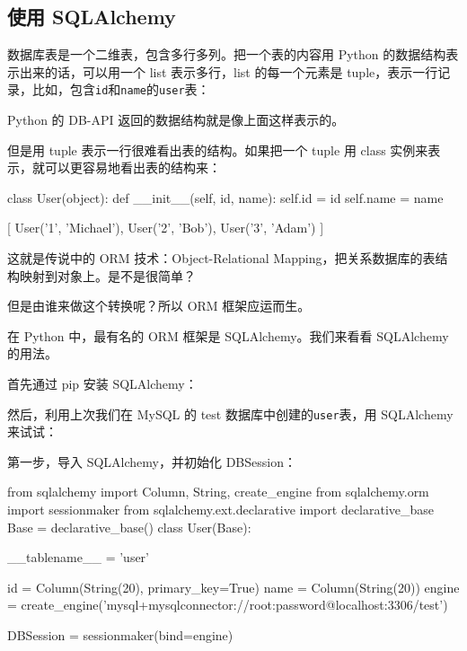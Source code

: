 \hypertarget{ux4f7fux7528-sqlalchemy}{%
\subsection{使用 SQLAlchemy}\label{ux4f7fux7528-sqlalchemy}}

数据库表是一个二维表，包含多行多列。把一个表的内容用 Python
的数据结构表示出来的话，可以用一个 list 表示多行，list 的每一个元素是
tuple，表示一行记录，比如，包含\texttt{id}和\texttt{name}的\texttt{user}表：

\begin{pythoncode}
\end{pythoncode}

Python 的 DB-API 返回的数据结构就是像上面这样表示的。

但是用 tuple 表示一行很难看出表的结构。如果把一个 tuple 用 class
实例来表示，就可以更容易地看出表的结构来：

\begin{pythoncode}
class User(object):
    def __init__(self, id, name):
        self.id = id
        self.name = name

[
    User('1', 'Michael'),
    User('2', 'Bob'),
    User('3', 'Adam')
]
\end{pythoncode}

这就是传说中的 ORM 技术：Object-Relational
Mapping，把关系数据库的表结构映射到对象上。是不是很简单？

但是由谁来做这个转换呢？所以 ORM 框架应运而生。

在 Python 中，最有名的 ORM 框架是 SQLAlchemy。我们来看看 SQLAlchemy
的用法。

首先通过 pip 安装 SQLAlchemy：


然后，利用上次我们在 MySQL 的 test 数据库中创建的\texttt{user}表，用
SQLAlchemy 来试试：

第一步，导入 SQLAlchemy，并初始化 DBSession：

\begin{pythoncode}
from sqlalchemy import Column, String, create_engine
from sqlalchemy.orm import sessionmaker
from sqlalchemy.ext.declarative import declarative_base
Base = declarative_base()
class User(Base):
    
    __tablename__ = 'user'

    
    id = Column(String(20), primary_key=True)
    name = Column(String(20))
engine = create_engine('mysql+mysqlconnector://root:password@localhost:3306/test')

DBSession = sessionmaker(bind=engine)
\end{pythoncode}

